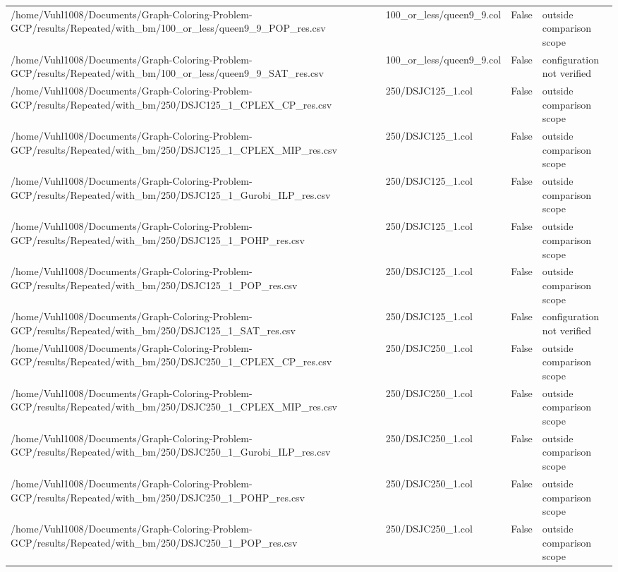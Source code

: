 \begin{table}[htbp]
\begin{tabular}{llll}
/home/Vuhl1008/Documents/Graph-Coloring-Problem-GCP/results/Repeated/with\_bm/100\_or\_less/queen9\_9\_POP\_res.csv & 100\_or\_less/queen9\_9.col & False & outside comparison scope \\
/home/Vuhl1008/Documents/Graph-Coloring-Problem-GCP/results/Repeated/with\_bm/100\_or\_less/queen9\_9\_SAT\_res.csv & 100\_or\_less/queen9\_9.col & False & configuration not verified \\
/home/Vuhl1008/Documents/Graph-Coloring-Problem-GCP/results/Repeated/with\_bm/250/DSJC125\_1\_CPLEX\_CP\_res.csv & 250/DSJC125\_1.col & False & outside comparison scope \\
/home/Vuhl1008/Documents/Graph-Coloring-Problem-GCP/results/Repeated/with\_bm/250/DSJC125\_1\_CPLEX\_MIP\_res.csv & 250/DSJC125\_1.col & False & outside comparison scope \\
/home/Vuhl1008/Documents/Graph-Coloring-Problem-GCP/results/Repeated/with\_bm/250/DSJC125\_1\_Gurobi\_ILP\_res.csv & 250/DSJC125\_1.col & False & outside comparison scope \\
/home/Vuhl1008/Documents/Graph-Coloring-Problem-GCP/results/Repeated/with\_bm/250/DSJC125\_1\_POHP\_res.csv & 250/DSJC125\_1.col & False & outside comparison scope \\
/home/Vuhl1008/Documents/Graph-Coloring-Problem-GCP/results/Repeated/with\_bm/250/DSJC125\_1\_POP\_res.csv & 250/DSJC125\_1.col & False & outside comparison scope \\
/home/Vuhl1008/Documents/Graph-Coloring-Problem-GCP/results/Repeated/with\_bm/250/DSJC125\_1\_SAT\_res.csv & 250/DSJC125\_1.col & False & configuration not verified \\
/home/Vuhl1008/Documents/Graph-Coloring-Problem-GCP/results/Repeated/with\_bm/250/DSJC250\_1\_CPLEX\_CP\_res.csv & 250/DSJC250\_1.col & False & outside comparison scope \\
/home/Vuhl1008/Documents/Graph-Coloring-Problem-GCP/results/Repeated/with\_bm/250/DSJC250\_1\_CPLEX\_MIP\_res.csv & 250/DSJC250\_1.col & False & outside comparison scope \\
/home/Vuhl1008/Documents/Graph-Coloring-Problem-GCP/results/Repeated/with\_bm/250/DSJC250\_1\_Gurobi\_ILP\_res.csv & 250/DSJC250\_1.col & False & outside comparison scope \\
/home/Vuhl1008/Documents/Graph-Coloring-Problem-GCP/results/Repeated/with\_bm/250/DSJC250\_1\_POHP\_res.csv & 250/DSJC250\_1.col & False & outside comparison scope \\
/home/Vuhl1008/Documents/Graph-Coloring-Problem-GCP/results/Repeated/with\_bm/250/DSJC250\_1\_POP\_res.csv & 250/DSJC250\_1.col & False & outside comparison scope \\

\end{tabular}
\end{table}
